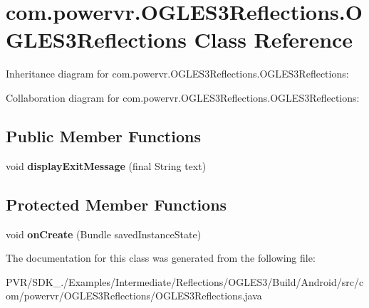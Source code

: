 \hypertarget{classcom_1_1powervr_1_1_o_g_l_e_s3_reflections_1_1_o_g_l_e_s3_reflections}{\section{com.\+powervr.\+O\+G\+L\+E\+S3\+Reflections.\+O\+G\+L\+E\+S3\+Reflections Class Reference}
\label{classcom_1_1powervr_1_1_o_g_l_e_s3_reflections_1_1_o_g_l_e_s3_reflections}
}


Inheritance diagram for com.\+powervr.\+O\+G\+L\+E\+S3\+Reflections.\+O\+G\+L\+E\+S3\+Reflections\+:


Collaboration diagram for com.\+powervr.\+O\+G\+L\+E\+S3\+Reflections.\+O\+G\+L\+E\+S3\+Reflections\+:
\subsection*{Public Member Functions}
\begin{DoxyCompactItemize}
\item 
\hypertarget{classcom_1_1powervr_1_1_o_g_l_e_s3_reflections_1_1_o_g_l_e_s3_reflections_a99f32bfab85b05ecee0cf08f7b5d4140}{void {\bfseries display\+Exit\+Message} (final String text)}\label{classcom_1_1powervr_1_1_o_g_l_e_s3_reflections_1_1_o_g_l_e_s3_reflections_a99f32bfab85b05ecee0cf08f7b5d4140}

\end{DoxyCompactItemize}
\subsection*{Protected Member Functions}
\begin{DoxyCompactItemize}
\item 
\hypertarget{classcom_1_1powervr_1_1_o_g_l_e_s3_reflections_1_1_o_g_l_e_s3_reflections_a8a185266313e65487fd6674b8311a086}{void {\bfseries on\+Create} (Bundle saved\+Instance\+State)}\label{classcom_1_1powervr_1_1_o_g_l_e_s3_reflections_1_1_o_g_l_e_s3_reflections_a8a185266313e65487fd6674b8311a086}

\end{DoxyCompactItemize}


The documentation for this class was generated from the following file\+:\begin{DoxyCompactItemize}
\item 
P\+V\+R/\+S\+D\+K\+\_./\+Examples/\+Intermediate/\+Reflections/\+O\+G\+L\+E\+S3/\+Build/\+Android/src/com/powervr/\+O\+G\+L\+E\+S3\+Reflections/O\+G\+L\+E\+S3\+Reflections.\+java\end{DoxyCompactItemize}
